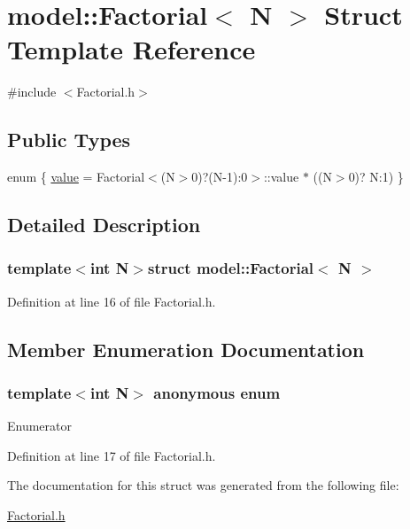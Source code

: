 \hypertarget{structmodel_1_1_factorial}{}\section{model\+:\+:Factorial$<$ N $>$ Struct Template Reference}
\label{structmodel_1_1_factorial}


{\ttfamily \#include $<$Factorial.\+h$>$}

\subsection*{Public Types}
\begin{DoxyCompactItemize}
\item 
enum \{ \hyperlink{structmodel_1_1_factorial_af7374735bad395dcd8998852c1c208d1ae9d3a1d9abc84852317fe77e85e447c5}{value} = Factorial$<$(N$>$0)?(N-\/1)\+:0$>$\+:\+:value $\ast$ ((N$>$0)? N\+:1)
 \}
\end{DoxyCompactItemize}


\subsection{Detailed Description}
\subsubsection*{template$<$int N$>$struct model\+::\+Factorial$<$ N $>$}



Definition at line 16 of file Factorial.\+h.



\subsection{Member Enumeration Documentation}
\hypertarget{structmodel_1_1_factorial_af7374735bad395dcd8998852c1c208d1}{}\subsubsection[{anonymous enum}]{\setlength{\rightskip}{0pt plus 5cm}template$<$int N$>$ anonymous enum}\label{structmodel_1_1_factorial_af7374735bad395dcd8998852c1c208d1}
\begin{Desc}
\item[Enumerator]\par
\begin{description}
\item[{\em 
\hypertarget{structmodel_1_1_factorial_af7374735bad395dcd8998852c1c208d1ae9d3a1d9abc84852317fe77e85e447c5}{}value\label{structmodel_1_1_factorial_af7374735bad395dcd8998852c1c208d1ae9d3a1d9abc84852317fe77e85e447c5}
}]\end{description}
\end{Desc}


Definition at line 17 of file Factorial.\+h.



The documentation for this struct was generated from the following file\+:\begin{DoxyCompactItemize}
\item 
\hyperlink{_factorial_8h}{Factorial.\+h}\end{DoxyCompactItemize}
